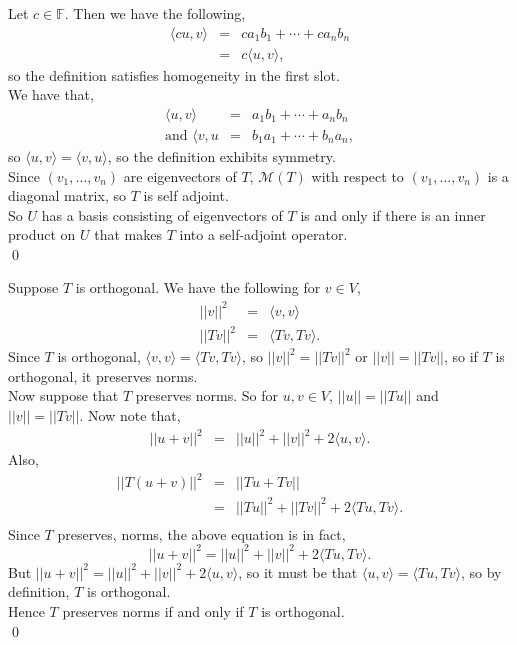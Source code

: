 \documentclass[12pt]{article}
\newcommand{\problem}[1]{\vspace{0.3in} \noindent {\bf Problem #1}}
\begin{document}
\noindent
Let $c \in \mathbb{F}$. Then we have the following,
\begin{eqnarray*}
\langle cu, v \rangle &=& ca_1b_1 + \cdots + ca_nb_n\\
&=& c \langle u, v \rangle, 
\end{eqnarray*}
so the definition satisfies homogeneity in the first slot.\\

\noindent
We have that,
\begin{eqnarray*}
\langle u, v \rangle &=& a_1b_1 + \cdots + a_nb_n\\
\text{and } \langle v, u &=& b_1a_1 + \cdots + b_na_n,
\end{eqnarray*}
so $\langle u, v \rangle = \langle v, u \rangle$, so the definition exhibits symmetry.\\

\noindent
Since $(v_1, \ldots, v_n)$ are eigenvectors of $T$, $\mathcal{M}(T)$ with respect to $(v_1, \ldots, v_n)$ is a diagonal matrix, so $T$ is self adjoint.\\

\noindent
So $U$ has a basis consisting of eigenvectors of $T$ is and only if there is an inner product on $U$ that makes $T$ into a self-adjoint operator.\\
\qed

\problem{3} Suppose $T$ is orthogonal. We have the following for $v \in V$,
\begin{eqnarray*}
||v||^2 &=& \langle v, v \rangle\\
||Tv||^2 &=& \langle Tv, Tv \rangle.
\end{eqnarray*}
Since $T$ is orthogonal, $\langle v, v \rangle = \langle Tv, Tv \rangle$, so $||v||^2 = ||Tv||^2$ or $||v|| = ||Tv||$, so if $T$ is orthogonal, it preserves norms.\\

\noindent
Now suppose that $T$ preserves norms. So for $u, v \in V$, $||u|| = ||Tu||$ and $||v|| = ||Tv||$. Now note that,
\begin{eqnarray*}
||u + v||^2 &=& ||u||^2 + ||v||^2 + 2 \langle u, v \rangle.
\end{eqnarray*}
Also,
\begin{eqnarray*}
||T(u + v)||^2 &=& ||Tu + Tv||\\
&=& ||Tu||^2 + ||Tv||^2 + 2 \langle Tu, Tv \rangle.\\
\end{eqnarray*}
Since $T$ preserves, norms, the above equation is in fact,
$$
||u + v||^2 = ||u||^2 + ||v||^2 + 2\langle Tu, Tv \rangle.
$$
But $||u + v||^2 = ||u||^2 + ||v||^2 + 2 \langle u, v \rangle$, so it must be that $\langle u, v \rangle = \langle Tu, Tv \rangle$, so by definition, $T$ is orthogonal.\\

\noindent
Hence $T$ preserves norms if and only if $T$ is orthogonal.\\
\qed 
\end{document}
